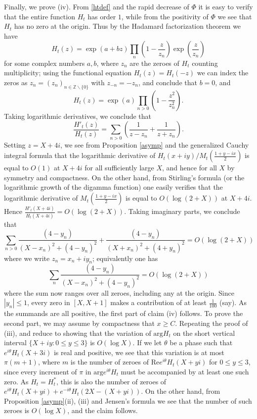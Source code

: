 \documentclass[a4paper,11pt,twoside]{amsart}
\newcommand\Z{\mathbb{Z}}
\begin{document}
Finally, we prove (iv).  From \eqref{htdef} and the rapid decrease of $\Phi$ it is easy to verify that the entire function $H_t$ has order $1$, while from the positivity of $\Phi$ we see that $H_t$ has no zero at the origin.  Thus by the Hadamard factorization theorem we have
$$ H_t(z) = \exp(a+bz) \prod_n \left( 1 - \frac{z}{z_n} \right) \exp( \frac{z}{z_n} )$$
for some complex numbers $a,b$, where $z_n$ are the zeroes of $H_t$ counting multiplicity; using the functional equation $H_t(z) = H_t(-z)$ we can index the zeros as $z_n = (z_n)_{n \in \Z \backslash \{0\}}$ with $z_{-n} = -z_n$, and conclude that $b=0$, and
$$ H_t(z) = \exp(a) \prod_{n>0} \left( 1 - \frac{z^2}{z_n^2} \right).$$
Taking logarithmic derivatives, we conclude that
\begin{equation}\label{hata}
 \frac{H'_t(z)}{H_t(z)} = \sum_{n>0} \left(\frac{1}{z-z_n} + \frac{1}{z+z_n}\right).
\end{equation}
Setting $z = X+4i$, we see from Proposition \ref{asymp} and the generalized Cauchy integral formula that the logarithmic derivative of $H_t(x+iy)/M_t\left(\frac{1+y-ix}{2}\right)$ is equal to $O(1)$ at $X+4i$ for all sufficiently large $X$, and hence for all $X$ by symmetry and compactness.  On the other hand, from Stirling's formula (or the logarithmic growth of the digamma function) one easily verifies that the logarithmic derivative of $M_t\left(\frac{1+y-ix}{2}\right)$  is equal to $O( \log(2+X) )$ at $X+4i$.  Hence $\frac{H'_t(X+4i)}{H_t(X+4i)} = O(\log(2+X))$.  Taking imaginary parts, we conclude that
$$ \sum_{n>0} \frac{(4-y_n)}{(X-x_n)^2 + (4-y_n)^2} + \frac{(4-y_n)}{(X+x_n)^2 + (4+y_n)^2} = O(\log(2+X))$$
where we write $z_n = x_n + iy_n$; equivalently one has
$$ \sum_n \frac{(4-y_n)}{(X-x_n)^2 + (4-y_n)^2} = O(\log(2+X))$$
where the sum now ranges over all zeroes, including any at the origin. Since $|y_n| \leq 1$, every zero in $[X,X+1]$ makes a contribution of at least $\frac{1}{100}$ (say).  As the summands are all positive, the first part of claim (iv) follows.  To prove the second part, we may assume by compactness that $x \geq C$.  Repeating the proof of (iii), and reduce to showing that the variation of $\mathrm{arg} H_t$ on the short vertical interval $\{ X+iy: 0 \leq y \leq 3 \}$ is $O( \log X )$.  If we let $\theta$ be a phase such that $e^{i\theta} H_t(X+3i)$ is real and positive, we see that this variation is at most $\pi(m+1)$, where $m$ is the number of zeroes of $\mathrm{Re} e^{i\theta} H_t(X+yi)$ for $0 \leq y \leq 3$, since every increment of $\pi$ in $\mathrm{arg} e^{i\theta} H_t$ must be accompanied by at least one such zero.  As $H_t = H_t^*$, this is also the number of zeroes of $e^{i\theta} H_t(X+yi) + e^{-i\theta} H_t(2X - (X+yi))$.  On the other hand, from Proposition \ref{asymp}(ii), (iii) and Jensen's formula we see that the number of such zeroes is $O( \log X )$, and the claim follows.
\end{document}
